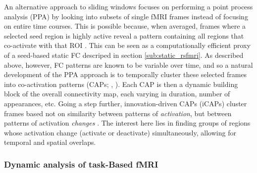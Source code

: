 An alternative approach to sliding windows focuses on performing a point process analysis (PPA) by looking into subsets of single fMRI frames instead of focusing on entire time courses. This is possible because, when averaged, frames where a selected seed region is highly active reveal a pattern containing all regions that co-activate with that ROI \citep{Tagliazucchi2012}. This can be seen as a computationally efficient proxy of a seed-based static FC descriped in section \ref{sub:static_rsfmri}. As described above, however, FC patterns are known to be variable over time, and so a natural development of the PPA approach is to temporally cluster these selected frames into co-activation patterns (CAPs; \citeauthor{Liu2018}, \citeyear{Liu2018}). Each CAP is then a dynamic building block of the overall connectivity map, each varying in duration, number of appearances, etc. Going a step further, innovation-driven CAPs (iCAPs) cluster frames based not on similarity between patterns of \textit{activation}, but between patterns of activation  \textit{changes} \citep{Karahanoglu2015a}. The interest here lies in finding groups of regions whose activation change (activate or deactivate) simultaneously, allowing for temporal and spatial overlaps.     

\subsubsection{Dynamic analysis of task-Based fMRI}

